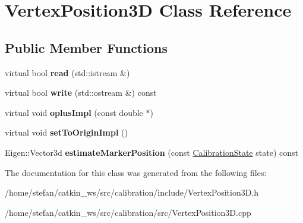 \hypertarget{classVertexPosition3D}{\section{\-Vertex\-Position3\-D \-Class \-Reference}
\label{classVertexPosition3D}
}
\subsection*{\-Public \-Member \-Functions}
\begin{DoxyCompactItemize}
\item 
\hypertarget{classVertexPosition3D_ab2901f62bab0c224e95a0e7f10c006ef}{virtual bool {\bfseries read} (std\-::istream \&)}\label{classVertexPosition3D_ab2901f62bab0c224e95a0e7f10c006ef}

\item 
\hypertarget{classVertexPosition3D_a6a9c429663ed1eb568b894a3d2f83f5b}{virtual bool {\bfseries write} (std\-::ostream \&) const }\label{classVertexPosition3D_a6a9c429663ed1eb568b894a3d2f83f5b}

\item 
\hypertarget{classVertexPosition3D_a11a4b6772e02a44203ad0fb824449d8e}{virtual void {\bfseries oplus\-Impl} (const double $\ast$)}\label{classVertexPosition3D_a11a4b6772e02a44203ad0fb824449d8e}

\item 
\hypertarget{classVertexPosition3D_af904c5967e9e4dd53282206c62491faf}{virtual void {\bfseries set\-To\-Origin\-Impl} ()}\label{classVertexPosition3D_af904c5967e9e4dd53282206c62491faf}

\item 
\hypertarget{classVertexPosition3D_a0aa22b03e0c190abdb695f8eb2a09892}{\-Eigen\-::\-Vector3d {\bfseries estimate\-Marker\-Position} (const \hyperlink{classCalibrationState}{\-Calibration\-State} state) const }\label{classVertexPosition3D_a0aa22b03e0c190abdb695f8eb2a09892}

\end{DoxyCompactItemize}


\-The documentation for this class was generated from the following files\-:\begin{DoxyCompactItemize}
\item 
/home/stefan/catkin\-\_\-ws/src/calibration/include/\-Vertex\-Position3\-D.\-h\item 
/home/stefan/catkin\-\_\-ws/src/calibration/src/\-Vertex\-Position3\-D.\-cpp\end{DoxyCompactItemize}
